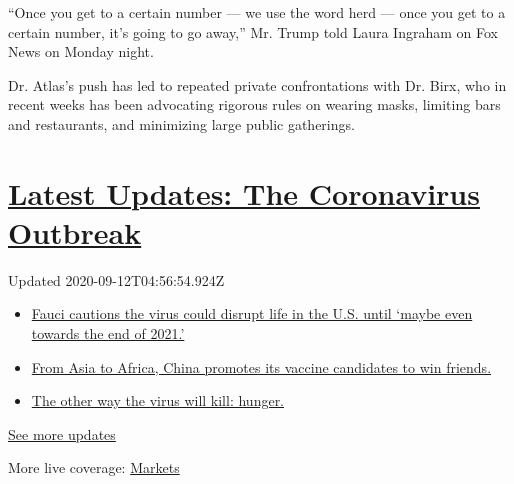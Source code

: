 ``Once you get to a certain number --- we use the word herd --- once you
get to a certain number, it's going to go away,'' Mr. Trump told Laura
Ingraham on Fox News on Monday night.

Dr. Atlas's push has led to repeated private confrontations with Dr.
Birx, who in recent weeks has been advocating rigorous rules on wearing
masks, limiting bars and restaurants, and minimizing large public
gatherings.

\hypertarget{latest-updates-the-coronavirus-outbreak}{%
\section{\texorpdfstring{\href{https://www.nytimes3xbfgragh.onion/2020/09/11/world/covid-19-coronavirus.html?action=click\&pgtype=Article\&state=default\&region=MAIN_CONTENT_1\&context=storylines_live_updates}{Latest
Updates: The Coronavirus
Outbreak}}{Latest Updates: The Coronavirus Outbreak}}\label{latest-updates-the-coronavirus-outbreak}}

Updated 2020-09-12T04:56:54.924Z

\begin{itemize}
\tightlist
\item
  \href{https://www.nytimes3xbfgragh.onion/2020/09/11/world/covid-19-coronavirus.html?action=click\&pgtype=Article\&state=default\&region=MAIN_CONTENT_1\&context=storylines_live_updates\#link-dfb8a16}{Fauci
  cautions the virus could disrupt life in the U.S. until `maybe even
  towards the end of 2021.'}
\item
  \href{https://www.nytimes3xbfgragh.onion/2020/09/11/world/covid-19-coronavirus.html?action=click\&pgtype=Article\&state=default\&region=MAIN_CONTENT_1\&context=storylines_live_updates\#link-7104d154}{From
  Asia to Africa, China promotes its vaccine candidates to win friends.}
\item
  \href{https://www.nytimes3xbfgragh.onion/2020/09/11/world/covid-19-coronavirus.html?action=click\&pgtype=Article\&state=default\&region=MAIN_CONTENT_1\&context=storylines_live_updates\#link-393ad215}{The
  other way the virus will kill: hunger.}
\end{itemize}

\href{https://www.nytimes3xbfgragh.onion/2020/09/11/world/covid-19-coronavirus.html?action=click\&pgtype=Article\&state=default\&region=MAIN_CONTENT_1\&context=storylines_live_updates}{See
more updates}

More live coverage:
\href{https://www.nytimes3xbfgragh.onion/live/2020/09/11/business/stock-market-today-coronavirus?action=click\&pgtype=Article\&state=default\&region=MAIN_CONTENT_1\&context=storylines_live_updates}{Markets}


